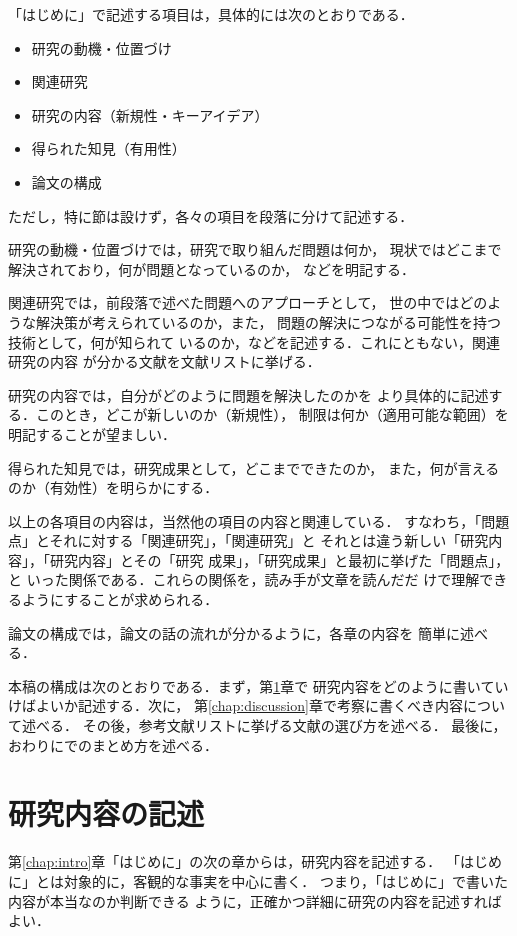 \documentclass[11pt,master]{oecu-thesis}
\begin{document}
「はじめに」で記述する項目は，具体的には次のとおりである．
\begin{itemize}
\item 研究の動機・位置づけ
\item 関連研究
\item 研究の内容（新規性・キーアイデア）
\item 得られた知見（有用性）
\item 論文の構成
\end{itemize}
ただし，特に節は設けず，各々の項目を段落に分けて記述する．

研究の動機・位置づけでは，研究で取り組んだ問題は何か，
現状ではどこまで解決されており，何が問題となっているのか，
などを明記する．

関連研究では，前段落で述べた問題へのアプローチとして，
世の中ではどのような解決策が考えられているのか，また，
問題の解決につながる可能性を持つ技術として，何が知られて
いるのか，などを記述する．これにともない，関連研究の内容
が分かる文献を文献リストに挙げる．

研究の内容では，自分がどのように問題を解決したのかを
より具体的に記述する．このとき，どこが新しいのか（新規性），
制限は何か（適用可能な範囲）を明記することが望ましい．

得られた知見では，研究成果として，どこまでできたのか，
また，何が言えるのか（有効性）を明らかにする．

以上の各項目の内容は，当然他の項目の内容と関連している．
すなわち，「問題点」とそれに対する「関連研究」，「関連研究」と
それとは違う新しい「研究内容」，「研究内容」とその「研究
成果」，「研究成果」と最初に挙げた「問題点」，と
いった関係である．これらの関係を，読み手が文章を読んだだ
けで理解できるようにすることが求められる．


論文の構成では，論文の話の流れが分かるように，各章の内容を
簡単に述べる．

本稿の構成は次のとおりである．まず，第\ref{chap:contents}章で
研究内容をどのように書いていけばよいか記述する．次に，
第\ref{chap:discussion}章で考察に書くべき内容について述べる．
その後，参考文献リストに挙げる文献の選び方を述べる．
最後に，おわりにでのまとめ方を述べる．

\chapter{研究内容の記述}\label{chap:contents}

第\ref{chap:intro}章「はじめに」の次の章からは，研究内容を記述する．
「はじめに」とは対象的に，客観的な事実を中心に書く．
つまり，「はじめに」で書いた内容が本当なのか判断できる
ように，正確かつ詳細に研究の内容を記述すればよい．
\end{document}
